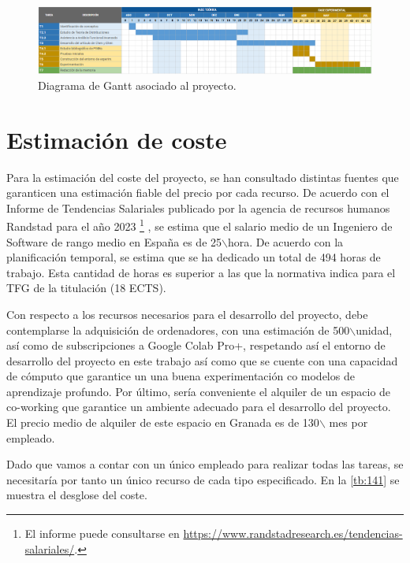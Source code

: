  \begin{figure}[htbp]
    \centering
    \includegraphics[width=1\textwidth]{img/img61.png}
    \caption{Diagrama de Gantt asociado al proyecto.}
    \label{fig:img61}
\end{figure}


\section{Estimación de coste}

Para la estimación del coste del proyecto, se han consultado distintas fuentes que garanticen una estimación fiable del precio por cada recurso. De acuerdo con el Informe de Tendencias Salariales publicado por la agencia de recursos humanos Randstad para el año 2023 \footnote{El informe puede consultarse en  \href{https://www.randstadresearch.es/tendencias-salariales/}{https://www.randstadresearch.es/tendencias-salariales/}.} , se estima que el salario medio de un Ingeniero de Software de rango medio en España es de 25\EUR $\backslash $hora. De acuerdo con la planificación temporal, se estima que se ha dedicado un total de 494 horas de trabajo. Esta cantidad de horas es superior a las que la normativa indica para el TFG de la titulación (18 ECTS).

Con respecto a los recursos necesarios para el desarrollo del proyecto, debe contemplarse la adquisición de ordenadores, con una estimación de 500\EUR$\backslash $unidad, así como de subscripciones a Google Colab Pro+, respetando así  el entorno de desarrollo del proyecto en este trabajo así como que se cuente con una capacidad de cómputo que garantice un una buena experimentación co modelos de aprendizaje profundo. Por último, sería conveniente el alquiler de un espacio de co-working que garantice un ambiente adecuado para el desarrollo del proyecto. El precio medio de alquiler de este espacio en Granada es de 130\EUR$\backslash $ mes por empleado.


Dado que vamos a contar con un único empleado para realizar todas las tareas, se necesitaría por tanto un único recurso de cada tipo especificado. En la \autoref{tb:141} se muestra el desglose del coste. 

